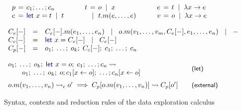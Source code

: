 \documentclass[acmsmall,anonymous,fleqn]{acmart}\settopmatter{printfolios=false,printccs=false,printacmref=false}
\theoremstyle{plain}
\theoremstyle{definition}
\newcommand{\lsep}{\;\;|\;\;}
\newcommand{\kvd}[1]{\textnormal{\textcolor{kvdclr}{\sffamily #1}}}
\newcommand{\narrow}[1]{\hspace{-0.6em}#1\hspace{-0.6em}}
\newcommand{\rname}[1]{{\sffamily\small(#1)}}
\begin{document}
\begin{figure}
\raggedright
\hspace{1.5em}{\small\sffamily Programs, commands, terms, expressions and values}
\begin{equation*}
\begin{array}{lcl}
p &\narrow{=}& c_1; \ldots; c_n\\
c &\narrow{=}& \kvd{let}~x = t \lsep t\\
\end{array}
\qquad
\begin{array}{lcl}
t &\narrow{=}& o \lsep x \\
  &\narrow{|}& t.m(e, \ldots, e)
\end{array}
\qquad
\begin{array}{lcl}
e &\narrow{=}& t \lsep \lambda x\rightarrow e\\
v &\narrow{=}& o \lsep \lambda x\rightarrow e\\
\end{array}
\end{equation*}

\vspace{0.5em}
\hspace{1.5em}{\small\sffamily Evaluation contexts of expressions}
\begin{equation*}
\begin{array}{lcl}
C_e[-] &=& C_e[-].m(e_1, \ldots, e_n) ~\lsep~ o.m(v_1, \ldots, v_{m}, C_e[-], e_1,\ldots , e_n) ~\lsep~ -\\
C_c[-] &=& \kvd{let}~x = C_e[-] ~\lsep~ C_e[-]\\
C_p[-] &=& o_1;\; \ldots;\; o_{k};\; C_c[-];\; c_{1};\; \ldots;\; c_n\\
\end{array}
\end{equation*}

\vspace{0.5em}
\hspace{1.5em}{\small\sffamily Let elimination and member reduction}
\begin{equation*}
\begin{array}{ll}
\hspace{-0.5em}\begin{array}{l}
o_1;\; \ldots;\; o_{k};\; \kvd{let}~x=o;\; c_{1};\; \ldots; c_n \rightsquigarrow\\
\qquad  o_1;\; \ldots;\; o_{k};\; o; c_{1}[x\leftarrow o];\; \ldots; c_n[x\leftarrow o]\end{array} &
\quad\text{\rname{let}}\\[1.2em]
{o.m(v_1, \ldots, v_n) \rightsquigarrow_\epsilon o'}\implies
  {C_p[o.m(v_1, \ldots, v_n)] \rightsquigarrow C_p[o']} &
\quad\text{\rname{external}}
\end{array}
\end{equation*}

\vspace{-0.5em}
\caption{Syntax, contexts and reduction rules of the data exploration calculus}
\label{fig:dec-calculus}
\end{figure}
\end{document}

